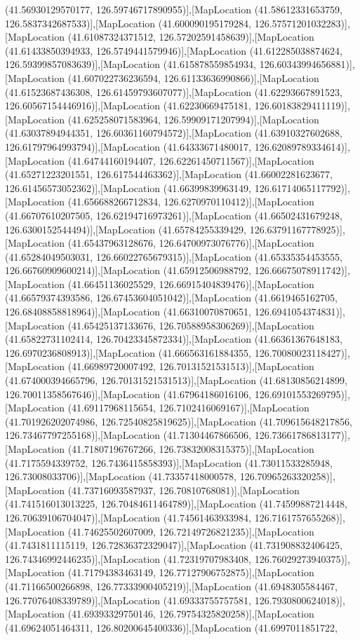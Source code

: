 (41.56930129570177, 126.59746717890955)],[MapLocation (41.58612331653759, 126.5837342687533)],[MapLocation (41.600090195179284, 126.57571201032283)],[MapLocation (41.61087324371512, 126.57202591458639)],[MapLocation (41.61433850394933, 126.5749441579946)],[MapLocation (41.612285038874624, 126.59399857083639)],[MapLocation (41.615878559854934, 126.60343994656881)],[MapLocation (41.607022736236594, 126.61133636990866)],[MapLocation (41.61523687436308, 126.61459793607077)],[MapLocation (41.62293667891523, 126.60567154446916)],[MapLocation (41.62230669475181, 126.60183829411119)],[MapLocation (41.625258071583964, 126.59909171207994)],[MapLocation (41.63037894944351, 126.60361160794572)],[MapLocation (41.63910327602688, 126.61797964993794)],[MapLocation (41.64333671480017, 126.62089789334614)],[MapLocation (41.64744160194407, 126.62261450711567)],[MapLocation (41.65271223201551, 126.617544463362)],[MapLocation (41.66002281623677, 126.61456573052362)],[MapLocation (41.66399839963149, 126.61714065117792)],[MapLocation (41.656688266712834, 126.6270970110412)],[MapLocation (41.66707610207505, 126.62194716973261)],[MapLocation (41.66502431679248, 126.6300152544494)],[MapLocation (41.65784255339429, 126.63791167778925)],[MapLocation (41.65437963128676, 126.64700973076776)],[MapLocation (41.65284049503031, 126.66022765679315)],[MapLocation (41.65335354453555, 126.66760909600214)],[MapLocation (41.65912506988792, 126.66675078911742)],[MapLocation (41.66451136025529, 126.66915404839476)],[MapLocation (41.66579374393586, 126.67453604051042)],[MapLocation (41.6619465162705, 126.68408858818964)],[MapLocation (41.66310070870651, 126.6941054374831)],[MapLocation (41.65425137133676, 126.70588958306269)],[MapLocation (41.65822731102414, 126.70423345872334)],[MapLocation (41.66361367648183, 126.6970236808913)],[MapLocation (41.666563161884355, 126.70080023118427)],[MapLocation (41.66989720007492, 126.70131521531513)],[MapLocation (41.674000394665796, 126.70131521531513)],[MapLocation (41.68130856214899, 126.70011358567646)],[MapLocation (41.67964186016106, 126.69101553269795)],[MapLocation (41.69117968115654, 126.7102416069167)],[MapLocation (41.701926202074986, 126.72540825819625)],[MapLocation (41.709615648217856, 126.73467797255168)],[MapLocation (41.71304467866506, 126.73661786813177)],[MapLocation (41.71807196767266, 126.73832008315375)],[MapLocation (41.7175594339752, 126.7436415858393)],[MapLocation (41.73011533285948, 126.73008033706)],[MapLocation (41.73357418000578, 126.70965263320258)],[MapLocation (41.73716093587937, 126.70810768081)],[MapLocation (41.741516013013225, 126.70484611464789)],[MapLocation (41.74599887214448, 126.70639106704047)],[MapLocation (41.74561463933984, 126.7161757655268)],[MapLocation (41.74625502607009, 126.72149726821235)],[MapLocation (41.7431811115119, 126.72836372329047)],[MapLocation (41.731908832406425, 126.74346992446235)],[MapLocation (41.72319707983408, 126.76029273940375)],[MapLocation (41.71794383463149, 126.77127906752875)],[MapLocation (41.71166500266898, 126.77333900405219)],[MapLocation (41.6948305584467, 126.77076408339789)],[MapLocation (41.69333755757581, 126.7930800624018)],[MapLocation (41.69393329750146, 126.79754325820258)],[MapLocation (41.69624051464311, 126.80200645400336)],[MapLocation (41.6997011851722, 